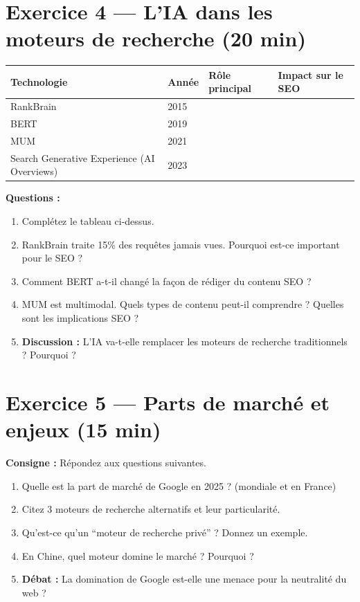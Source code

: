 \documentclass[12pt,a4paper]{report}
\begin{document}
\section{Exercice 4 --- L'IA dans les moteurs de recherche (20 min)}

\begin{longtable}{lllp{5cm}}
\toprule
Technologie & Ann\'{e}e & R\^{o}le principal & Impact sur le SEO \\
\midrule
\endhead
\bottomrule
\endfoot
RankBrain & 2015 & & \\
BERT & 2019 & & \\
MUM & 2021 & & \\
Search Generative Experience (AI Overviews) & 2023 & & \\
\bottomrule
\end{longtable}

\textbf{Questions :}
\begin{enumerate}
    \item Compl\'{e}tez le tableau ci-dessus.
    \item RankBrain traite 15\% des requ\^{e}tes jamais vues. Pourquoi est-ce important pour le SEO ?
    \item Comment BERT a-t-il chang\'{e} la fa\c{c}on de r\'{e}diger du contenu SEO ?
    \item MUM est multimodal. Quels types de contenu peut-il comprendre ? Quelles sont les implications SEO ?
    \item \textbf{Discussion :} L'IA va-t-elle remplacer les moteurs de recherche traditionnels ? Pourquoi ?
\end{enumerate}

\section{Exercice 5 --- Parts de march\'{e} et enjeux (15 min)}

\textbf{Consigne :} R\'{e}pondez aux questions suivantes.

\begin{enumerate}
    \item Quelle est la part de march\'{e} de Google en 2025 ? (mondiale et en France)
    \item Citez 3 moteurs de recherche alternatifs et leur particularit\'{e}.
    \item Qu'est-ce qu'un ``moteur de recherche priv\'{e}'' ? Donnez un exemple.
    \item En Chine, quel moteur domine le march\'{e} ? Pourquoi ?
    \item \textbf{D\'{e}bat :} La domination de Google est-elle une menace pour la neutralit\'{e} du web ?
\end{enumerate}
\end{document}
